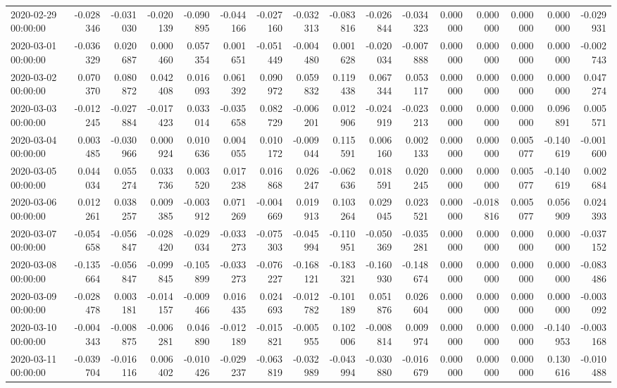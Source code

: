 \begin{tabular}{lrrrrrrrrrrrrrrr}
2020-02-29 00:00:00 & -0.028346 & -0.031030 & -0.020139 & -0.090895 & -0.044166 & -0.027160 & -0.032313 & -0.083816 & -0.026844 & -0.034323 & 0.000000 & 0.000000 & 0.000000 & 0.000000 & -0.029931 \\
2020-03-01 00:00:00 & -0.036329 & 0.020687 & 0.000460 & 0.057354 & 0.001651 & -0.051449 & -0.004480 & 0.001628 & -0.020034 & -0.007888 & 0.000000 & 0.000000 & 0.000000 & 0.000000 & -0.002743 \\
2020-03-02 00:00:00 & 0.070370 & 0.080872 & 0.042408 & 0.016093 & 0.061392 & 0.090972 & 0.059832 & 0.119438 & 0.067344 & 0.053117 & 0.000000 & 0.000000 & 0.000000 & 0.000000 & 0.047274 \\
2020-03-03 00:00:00 & -0.012245 & -0.027884 & -0.017423 & 0.033014 & -0.035658 & 0.082729 & -0.006201 & 0.012906 & -0.024919 & -0.023213 & 0.000000 & 0.000000 & 0.000000 & 0.096891 & 0.005571 \\
2020-03-04 00:00:00 & 0.003485 & -0.030966 & 0.000924 & 0.010636 & 0.004055 & 0.010172 & -0.009044 & 0.115591 & 0.006160 & 0.002133 & 0.000000 & 0.000000 & 0.005077 & -0.140619 & -0.001600 \\
2020-03-05 00:00:00 & 0.044034 & 0.055274 & 0.033736 & 0.003520 & 0.017238 & 0.016868 & 0.026247 & -0.062636 & 0.018591 & 0.020245 & 0.000000 & 0.000000 & 0.005077 & -0.140619 & 0.002684 \\
2020-03-06 00:00:00 & 0.012261 & 0.038257 & 0.009385 & -0.003912 & 0.071269 & -0.004669 & 0.019913 & 0.103264 & 0.029045 & 0.023521 & 0.000000 & -0.018816 & 0.005077 & 0.056909 & 0.024393 \\
2020-03-07 00:00:00 & -0.054658 & -0.056847 & -0.028420 & -0.029034 & -0.033273 & -0.075303 & -0.045994 & -0.110951 & -0.050369 & -0.035281 & 0.000000 & 0.000000 & 0.000000 & 0.000000 & -0.037152 \\
2020-03-08 00:00:00 & -0.135664 & -0.056847 & -0.099845 & -0.105899 & -0.033273 & -0.076227 & -0.168121 & -0.183321 & -0.160930 & -0.148674 & 0.000000 & 0.000000 & 0.000000 & 0.000000 & -0.083486 \\
2020-03-09 00:00:00 & -0.028478 & 0.003181 & -0.014157 & -0.009466 & 0.016435 & 0.024693 & -0.012782 & -0.101189 & 0.051876 & 0.026604 & 0.000000 & 0.000000 & 0.000000 & 0.000000 & -0.003092 \\
2020-03-10 00:00:00 & -0.004343 & -0.008875 & -0.006281 & 0.046890 & -0.012189 & -0.015821 & -0.005955 & 0.102006 & -0.008814 & 0.009974 & 0.000000 & 0.000000 & 0.000000 & -0.140953 & -0.003168 \\
2020-03-11 00:00:00 & -0.039704 & -0.016116 & 0.006402 & -0.010426 & -0.029237 & -0.063819 & -0.032989 & -0.043994 & -0.030880 & -0.016679 & 0.000000 & 0.000000 & 0.000000 & 0.130616 & -0.010488 \\

\end{tabular}
